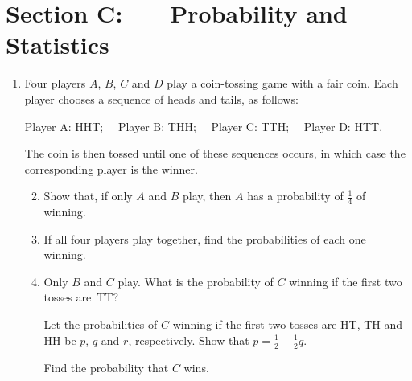 \documentclass[a4, 11pt]{report}
\newlength{\qspace}
\newcounter{qnumber}
\newenvironment{question}%
 {\vspace{\qspace}
  \begin{enumerate}[\bfseries 1\quad][10]%
    \setcounter{enumi}{\value{qnumber}}%
    \item%
 }
{
  \end{enumerate}
  \filbreak
  \stepcounter{qnumber}
 }
\newenvironment{questionparts}[1][1]%
 {
  \begin{enumerate}[\bfseries (i)]%
    \setcounter{enumii}{#1}
    \addtocounter{enumii}{-1}
    \setlength{\itemsep}{5mm}
    \setlength{\parskip}{8pt}
 }
 {
  \end{enumerate}
 }
\renewcommand{\.}[1]{\ensuremath{\mathrm{#1}}}
\newcommand{\+}[1]{\ensuremath{\mathbf{#1}}}
\begin{document}
	

	
	\newpage
\section*{Section C: \ \ \ Probability and Statistics}


\begin{question}
Four players $A$, $B$, $C$ and $D$ play a coin-tossing game with a fair coin. Each player chooses a sequence of heads and tails, as follows:

\noindent
Player A: HHT; \ \ Player B: THH; \ \ Player C: TTH; \ \ Player D: HTT.
\noindent 

The coin is then tossed until one of these sequences occurs, in which case the corresponding player is the winner.

\begin{questionparts}
\item Show that, if only $A$ and $B$ play, then $A$ has a probability of $\frac14$ of winning.

\item If all four players play together, find the probabilities of each one winning.
\item Only $B$ and $C$ play. What is the probability of $C$ winning if the first two tosses are~TT?

Let the probabilities of $C$ winning if the first two tosses are HT, TH and HH be $p$, $q$ and $r$, respectively. Show that $p=\frac12 +\frac12q$.

Find the probability that $C$ wins.
\end{questionparts}
\end{question}
\end{document}
